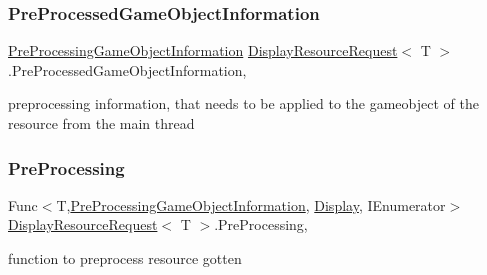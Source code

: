 \mbox{\label{class_display_resource_request_ae237edf32250ad6e9a417d6c24224537}} 
\subsubsection{\texorpdfstring{Pre\+Processed\+Game\+Object\+Information}{PreProcessedGameObjectInformation}}
{\footnotesize\ttfamily \mbox{\hyperlink{class_pre_processing_game_object_information}{Pre\+Processing\+Game\+Object\+Information}} \mbox{\hyperlink{class_display_resource_request}{Display\+Resource\+Request}}$<$ T $>$.Pre\+Processed\+Game\+Object\+Information\hspace{0.3cm}{\ttfamily [get]}, {\ttfamily [set]}}



preprocessing information, that needs to be applied to the gameobject of the resource from the main thread 

\mbox{\label{class_display_resource_request_a46343aa637c011c702f7b734e52fbe0b}} 
\subsubsection{\texorpdfstring{Pre\+Processing}{PreProcessing}}
{\footnotesize\ttfamily Func$<$T,\mbox{\hyperlink{class_pre_processing_game_object_information}{Pre\+Processing\+Game\+Object\+Information}}, \mbox{\hyperlink{class_display}{Display}}, I\+Enumerator$>$ \mbox{\hyperlink{class_display_resource_request}{Display\+Resource\+Request}}$<$ T $>$.Pre\+Processing\hspace{0.3cm}{\ttfamily [get]}, {\ttfamily [set]}}



function to preprocess resource gotten 

\mbox{\label{class_display_resource_request_a45c1024a90ddda1f8837daa50796458c}} 
